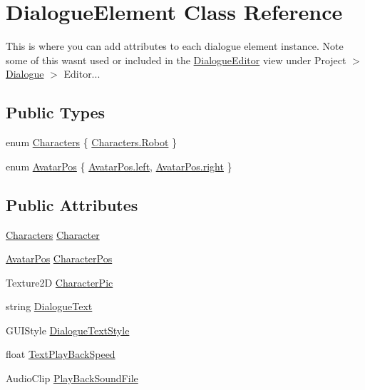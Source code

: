 \hypertarget{class_dialogue_element}{}\section{Dialogue\+Element Class Reference}
\label{class_dialogue_element}


This is where you can add attributes to each dialogue element instance. Note some of this wasn\textquotesingle{}t used or included in the \mbox{\hyperlink{class_dialogue_editor}{Dialogue\+Editor}} view under Project $>$ \mbox{\hyperlink{class_dialogue}{Dialogue}} $>$ Editor...  


\subsection*{Public Types}
\begin{DoxyCompactItemize}
\item 
enum \mbox{\hyperlink{class_dialogue_element_ae49b75aacbe9e237b4801a4153dd1bfa}{Characters}} \{ \mbox{\hyperlink{class_dialogue_element_ae49b75aacbe9e237b4801a4153dd1bfaa5d1eca158c00250d9c4c32d947b7c433}{Characters.\+Robot}}
 \}
\item 
enum \mbox{\hyperlink{class_dialogue_element_a4713e15d24a53d5487f1d51b89cd55ee}{Avatar\+Pos}} \{ \mbox{\hyperlink{class_dialogue_element_a4713e15d24a53d5487f1d51b89cd55eea811882fecd5c7618d7099ebbd39ea254}{Avatar\+Pos.\+left}}, 
\mbox{\hyperlink{class_dialogue_element_a4713e15d24a53d5487f1d51b89cd55eea7c4f29407893c334a6cb7a87bf045c0d}{Avatar\+Pos.\+right}}
 \}
\end{DoxyCompactItemize}
\subsection*{Public Attributes}
\begin{DoxyCompactItemize}
\item 
\mbox{\hyperlink{class_dialogue_element_ae49b75aacbe9e237b4801a4153dd1bfa}{Characters}} \mbox{\hyperlink{class_dialogue_element_ab41891d5d0d2f140ef8cb70cd2471e9c}{Character}}
\item 
\mbox{\hyperlink{class_dialogue_element_a4713e15d24a53d5487f1d51b89cd55ee}{Avatar\+Pos}} \mbox{\hyperlink{class_dialogue_element_ab77dcc6f1586a68b72a1d2d9dfca3b50}{Character\+Pos}}
\item 
Texture2D \mbox{\hyperlink{class_dialogue_element_a65e82dcc1e979f6890fd1f0c08cd43a6}{Character\+Pic}}
\item 
string \mbox{\hyperlink{class_dialogue_element_aa2557c80fc22e7327fb48a02991024de}{Dialogue\+Text}}
\item 
G\+U\+I\+Style \mbox{\hyperlink{class_dialogue_element_ad4d43ed3aa5816446241e93d59ebf409}{Dialogue\+Text\+Style}}
\item 
float \mbox{\hyperlink{class_dialogue_element_a14e05abcef33f93b97d5b3ae2c11dd1d}{Text\+Play\+Back\+Speed}}
\item 
Audio\+Clip \mbox{\hyperlink{class_dialogue_element_a39327338f1eff135aa4f3c258098cb8a}{Play\+Back\+Sound\+File}}
\end{DoxyCompactItemize}


